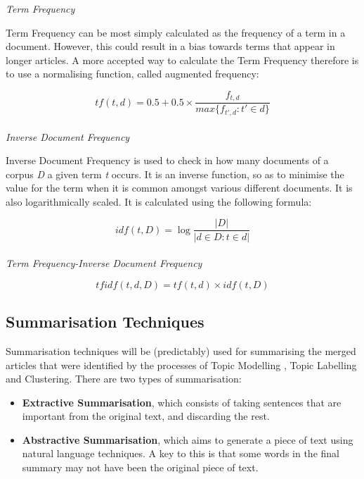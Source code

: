 \documentclass[12pt]{article}
\begin{document}
\emph{Term Frequency}

Term Frequency can be most simply calculated as the frequency of a term in a document. However, this could result in a bias towards terms that appear in longer articles. A more accepted way to calculate the Term Frequency therefore is to use a normalising function, called augmented frequency:

\[tf(t,d) = 0.5 + 0.5 \times \frac{f_{t,d}}{max\{f_{t',d} : t' \in d\}} \] \\

\emph{Inverse Document Frequency}

Inverse Document Frequency is used to check in how many documents of a corpus \emph{D} a given term \emph{t} occurs. It is an inverse function, so as to minimise the value for the term when it is common amongst various different documents. It is also logarithmically scaled. It is calculated using the following formula:

\[idf(t,D) = \log{\frac{\left|D\right|}{\left|d \in D : t \in d\right|}} \] \\

\emph{Term Frequency-Inverse Document Frequency}

\[tfidf(t,d,D) = tf(t,d) \times idf(t,D)\] 

\subsection{Summarisation Techniques}       

Summarisation techniques will be (predictably) used for summarising the merged articles that were identified by the processes of Topic Modelling , Topic Labelling and Clustering. There are two types of summarisation: 

\begin{itemize}
	\item \textbf{Extractive Summarisation}, which consists of taking sentences that are important from the original text, and discarding the rest.\cite{extractiveTechniques}
	\item \textbf{Abstractive Summarisation}, which aims to generate a piece of text using natural language techniques. A key to this is that some words in the final summary may not have been the original piece of text.
\end{itemize}
\end{document}
